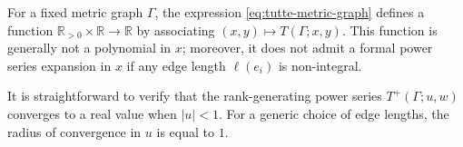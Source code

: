 \documentclass{amsart}
\theoremstyle{definition}
\newtheorem{eg}[thm]{Example}
\newcommand{\RR}{\mathbb{R}}
\newcommand{\RRpos}{\RR_{>0}}
\begin{document}
For a fixed metric graph $\Gamma$,
the expression \eqref{eq:tutte-metric-graph} defines a function
$\RRpos\times \RR \to \RR$
by associating $(x,y) \mapsto T(\Gamma; x,y)$. 
This function is generally not a polynomial in $x$; %
moreover,  it does not admit a formal power series expansion in $x$ 
if any edge length $\ell(e_i)$ is non-integral.

It is straightforward to verify that the rank-generating power series $T^+(\Gamma;u,w)$ converges to a real value when $|u|<1$.
For a generic choice of edge lengths, %
the radius of convergence in $u$ is equal to $1$.


%

%

 

\end{document}
